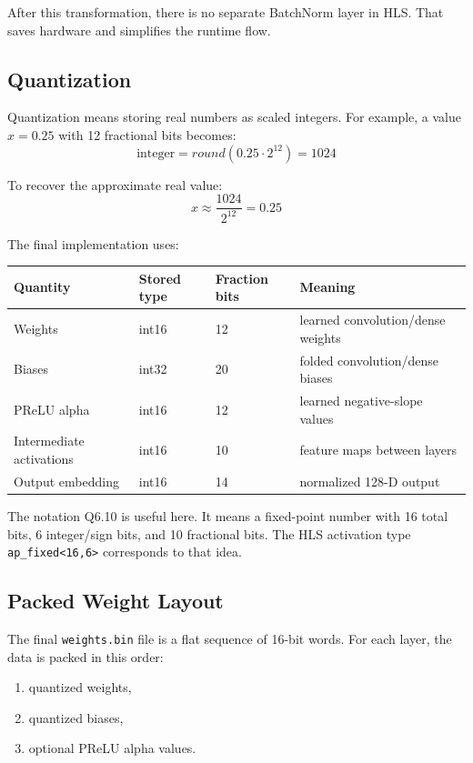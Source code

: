 \documentclass[11pt]{article}
\newcommand{\code}[1]{\texttt{#1}}
\begin{document}
After this transformation, there is no separate BatchNorm layer in HLS.
That saves hardware and simplifies the runtime flow.

\subsection{Quantization}

Quantization means storing real numbers as scaled integers.
For example, a value \(x = 0.25\) with 12 fractional bits becomes:
\[
  \text{integer} = round(0.25 \cdot 2^{12}) = 1024
\]

To recover the approximate real value:
\[
  x \approx \frac{1024}{2^{12}} = 0.25
\]

The final implementation uses:

\begin{center}
\begin{tabular}{llll}
\toprule
Quantity & Stored type & Fraction bits & Meaning \\
\midrule
Weights & int16 & 12 & learned convolution/dense weights \\
Biases & int32 & 20 & folded convolution/dense biases \\
PReLU alpha & int16 & 12 & learned negative-slope values \\
Intermediate activations & int16 & 10 & feature maps between layers \\
Output embedding & int16 & 14 & normalized 128-D output \\
\bottomrule
\end{tabular}
\end{center}

The notation Q6.10 is useful here.
It means a fixed-point number with 16 total bits, 6 integer/sign bits, and 10 fractional bits.
The HLS activation type \code{ap\_fixed<16,6>} corresponds to that idea.

\subsection{Packed Weight Layout}

The final \code{weights.bin} file is a flat sequence of 16-bit words.
For each layer, the data is packed in this order:

\begin{enumerate}[leftmargin=1.6em]
  \item quantized weights,
  \item quantized biases,
  \item optional PReLU alpha values.
\end{enumerate}
\end{document}
